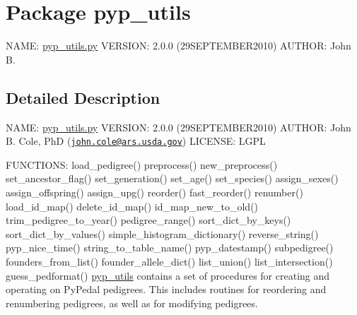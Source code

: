 \hypertarget{namespacepyp__utils}{
\section{Package pyp\_\-utils}
\label{namespacepyp__utils}
}


NAME: \hyperlink{pyp__utils_8py_source}{pyp\_\-utils.py} VERSION: 2.0.0 (29SEPTEMBER2010) AUTHOR: John B.  




\subsection{Detailed Description}
NAME: \hyperlink{pyp__utils_8py_source}{pyp\_\-utils.py} VERSION: 2.0.0 (29SEPTEMBER2010) AUTHOR: John B. Cole, PhD (\href{mailto:john.cole@ars.usda.gov}{\tt john.cole@ars.usda.gov}) LICENSE: LGPL

FUNCTIONS: load\_\-pedigree() preprocess() new\_\-preprocess() set\_\-ancestor\_\-flag() set\_\-generation() set\_\-age() set\_\-species() assign\_\-sexes() assign\_\-offspring() assign\_\-upg() reorder() fast\_\-reorder() renumber() load\_\-id\_\-map() delete\_\-id\_\-map() id\_\-map\_\-new\_\-to\_\-old() trim\_\-pedigree\_\-to\_\-year() pedigree\_\-range() sort\_\-dict\_\-by\_\-keys() sort\_\-dict\_\-by\_\-values() simple\_\-histogram\_\-dictionary() reverse\_\-string() pyp\_\-nice\_\-time() string\_\-to\_\-table\_\-name() pyp\_\-datestamp() subpedigree() founders\_\-from\_\-list() founder\_\-allele\_\-dict() list\_\-union() list\_\-intersection() guess\_\-pedformat() \hyperlink{namespacepyp__utils}{pyp\_\-utils} contains a set of procedures for creating and operating on PyPedal pedigrees. This includes routines for reordering and renumbering pedigrees, as well as for modifying pedigrees. 